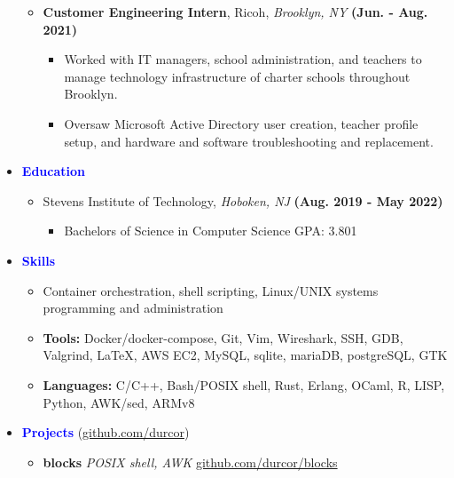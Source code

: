 \documentclass[11pt]{article}
\begin{document}
\begin{flushleft}
\begin{itemize}
\begin{itemize}
\begin{itemize}
                \end{itemize}
            \item \textbf{Customer Engineering Intern}, Ricoh, \textit{Brooklyn, NY} \hfill{\textbf{(Jun. - Aug. 2021)}}
                \begin{itemize}
                    \item Worked with IT managers, school administration, and teachers to manage technology infrastructure of charter schools throughout Brooklyn.
                    \item Oversaw Microsoft Active Directory user creation, teacher profile setup, and hardware and software troubleshooting and replacement.
                \end{itemize}
        \end{itemize}
    \item[] \Large \textcolor{blue}{\textbf{Education}} \normalsize
        \begin{itemize}
            \item Stevens Institute of Technology, \textit{Hoboken, NJ}  \hfill{\textbf{(Aug. 2019 - May 2022)}}
                \begin{itemize}
                    \item Bachelors of Science in Computer Science \hfill{GPA: 3.801}
                \end{itemize}
        \end{itemize}
    \item[] \Large \textcolor{blue}{\textbf{Skills}} \normalsize
        \begin{itemize}
            \item Container orchestration, shell scripting, Linux/UNIX systems programming and administration
            \item \textbf{Tools:} Docker/docker-compose, Git, Vim, Wireshark, SSH, GDB, Valgrind, LaTeX, AWS EC2, MySQL, sqlite, mariaDB, postgreSQL, GTK
            \item \textbf{Languages:} C/C++, Bash/POSIX shell, Rust, Erlang, OCaml, R, LISP, Python, AWK/sed, ARMv8
        \end{itemize}
    \item[] \Large \textcolor{blue}{\textbf{Projects}} (\href{https://github.com/durcor}{github.com/durcor}) \normalsize
        \begin{itemize}
            \item \textbf{blocks} \textit{POSIX shell, AWK} \hfill{\href{https://github.com/durcor/blocks}{github.com/durcor/blocks}}

\end{itemize}
\end{itemize}
\end{flushleft}
\end{document}
